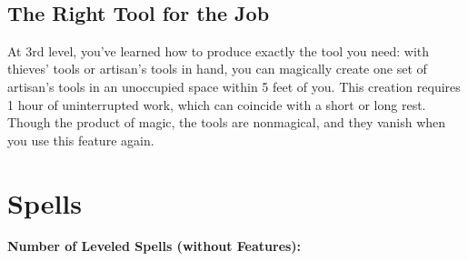\documentclass[letterpaper,openany,oneside,twocolumn]{book}
\begin{document}
\vspace*{-2.4\fontdimen6\font}\hfill\\
\subsection*{The Right Tool for the Job}
At 3rd level, you've learned how to produce exactly the tool you need: with thieves' tools or artisan's tools in hand, you can magically create one set of artisan's tools in an unoccupied space within 5 feet of you. This creation requires 1 hour of uninterrupted work, which can coincide with a short or long rest. Though the product of magic, the tools are nonmagical, and they vanish when you use this feature again.

\vfill\eject
\section*{Spells}
\textbf{Number of Leveled Spells (without Features):} \intcalcAdd{\calculateModifier{\IntelligenceScoreValue}}{\intcalcShr{\LevelValue}}
\end{document}
